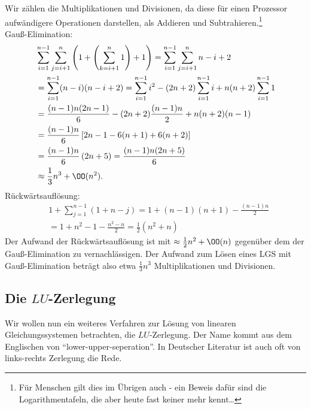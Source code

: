 \begin{bemn}[Rechenaufwand.]
Wir zählen die Multiplikationen und Divisionen, da
diese für einen Prozessor aufwändigere Operationen darstellen, als Addieren und Subtrahieren.\footnote{Für
Menschen gilt dies im Übrigen auch - ein Beweis dafür sind die
Logarithmentafeln, die aber heute fast keiner mehr kennt\ldots}\\
Gauß-Elimination:
\begin{align*}
&\sum\limits_{i=1}^{n-1}\sum\limits_{j=i+1}^n \left(1 +
\left(\sum\limits_{k=i+1}^n 1\right) + 1\right)
= \sum\limits_{i=1}^{n-1}\sum\limits_{j=i+1}^n n-i +2\\
 &= \sum\limits_{i=1}^{n-1}(n-i)(n-i +2)
= \sum\limits_{i=1}^{n-1}i^2 - (2n+2)\sum\limits_{i=1}^{n-1}i +
n(n+2)\sum\limits_{i=1}^{n-1} 1\\
&= \frac{(n-1)n(2n-1)}{6} - (2n+2)\frac{(n-1)n}{2} + n(n+2)(n-1)\\
&= \frac{(n-1)n}{6}\left[2n-1 - 6(n+1) + 6(n+2)\right]\\
&= \frac{(n-1)n}{6}\left(2n +5\right)
= \frac{(n-1)n(2n+5)}{6}\\
&\approx \frac{1}{3}n^3 + \OO(n^2).
\end{align*}
Rückwärtsauflösung:
\begin{align*}
&1 + \sum\limits_{j=1}^{n-1}\left(1+n-j\right) = 1 + (n-1)(n+1) -
\frac{(n-1)n}{2} \\ 
&= 1 + n^2 -1 -\frac{n^2-n}{2} =
\frac{1}{2}(n^2+n)
\end{align*}
Der Aufwand der Rückwärtsauflösung ist mit $\approx \frac{1}{2}n^2+\OO(n)$
gegenüber dem der Gauß-Elimination zu vernachlässigen. Der Aufwand zum Lösen
eines LGS mit Gauß-Elimination beträgt also etwa $\frac{1}{3}n^3$
Multiplikationen und Divisionen.
\end{bemn}

\subsection{Die $LU$-Zerlegung}
Wir wollen nun ein weiteres Verfahren zur Lösung von linearen
Gleichungssystemen betrachten, die $LU$-Zerlegung. Der Name kommt aus dem
Englischen von ``lower-upper-seperation''. In Deutscher Literatur ist 
auch oft von links-rechts Zerlegung die Rede.

